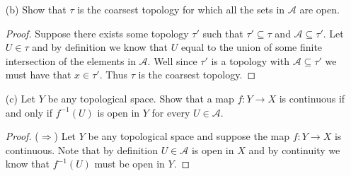 \documentclass[minion]{homework651}
\begin{document}
\begin{problems}
\begin{enumerate}
\begin{proof}
        By substitution we get, 
        \begin{equation*}
            \bigcup_{i \in I} U_i = \bigcup_{i \in I} \bigcup_{j \in J} A_{i,j} 
        \end{equation*}
        Note that this union is itself a union of finite intersections of elements of $\mathcal{A}$, thus $\tau$ is closed with respect to unions. 
        Let $\{U_i\}_I \subseteq \tau$ be a finite subset. Note that by substitution and associativity of intersection we get, 
        \begin{equation*}
            \bigcap_{i \in I} U_i = \bigcap_{i \in I}\bigcup_{j \in J} A_{i,j} =  \bigcup \bigcap_{\substack{i \in I\\ j \in J}} A_{i,j}.
        \end{equation*}
        Again we've managed to write our finite intersection as a union of finite intersections of elements of $\mathcal{A}$, thus $\tau$ is closed with respect to finite intersections. 
    \end{proof}




    \item[(b)] Show that $\tau$ is the coarsest topology for which all the sets in $\mathcal{A}$
    are open. 
    \begin{proof} Suppose there exists some topology $\tau'$ such that $\tau' \subseteq \tau$ and $\mathcal{A} \subseteq \tau'$. Let $U \in \tau$ and by definition we know that $U$ equal to the union of some finite intersection of the elements in $\mathcal{A}$. Well since $\tau'$ is a topology with $\mathcal{A} \subseteq \tau'$ we must have that $x \in \tau'$. Thus $\tau$ is the coarsest topology.
    \end{proof}


    \item[(c)] Let $Y$ be any topological space. Show that a map $f: Y \to X$ is continuous if and only if $f^{-1}(U)$
    is open in $Y$ for every $U \in \mathcal{A}$.
    \begin{proof} ($\Rightarrow$) Let $Y$ be any topological space and suppose the map $f: Y \to X$ is continuous. Note that by definition $U \in \mathcal{A}$ is open in $X$
        and by continuity we know that $f^{-1}(U)$ must be open in $Y$. 
    \end{proof}


\end{enumerate}
\end{problems}
\end{document}
